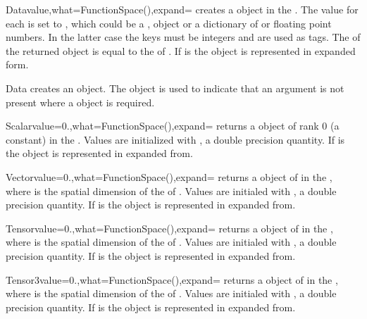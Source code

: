 \begin{classdesc}{Data}{value,what=FunctionSpace(),expand=\False}
creates a \Data object in the \FunctionSpace {}.
The value for each \DataSamplePoints is set to , which could be a \numpy, \Data object  or a dictionary of
\numpy or floating point numbers. In the latter case the keys must be integers and are used
as tags.
The \Shape of the returned object is equal to the \Shape of . If  is \True
the \Data object is represented in expanded form.
\end{classdesc}

\begin{classdesc}{Data}{}
creates an \EmptyData object. The \EmptyData object is used to indicate that an argument is not present
where a \Data object is required.
\end{classdesc}

\begin{funcdesc}{Scalar}{value=0.,what=FunctionSpace(),expand=\False}
returns a \Data object of rank 0 (a constant) in the \FunctionSpace {}.
Values are initialized with , a double precision quantity. If  is \True
the \Data object is represented in expanded from.
\end{funcdesc}

\begin{funcdesc}{Vector}{value=0.,what=FunctionSpace(),expand=\False}
returns a \Data object of \Shape {} in the \FunctionSpace {},
where  is the spatial dimension of the \Domain of .
Values are initialed with , a double precision quantity. If  is \True
the \Data object is represented in expanded from.
\end{funcdesc}

\begin{funcdesc}{Tensor}{value=0.,what=FunctionSpace(),expand=\False}
returns a \Data object of \Shape {} in the \FunctionSpace {},
where  is the spatial dimension of the \Domain of .
Values are initialed with , a double precision quantity. If  is \True
the \Data object is represented in expanded from.
\end{funcdesc}

\begin{funcdesc}{Tensor3}{value=0.,what=FunctionSpace(),expand=\False}
returns a \Data object of \Shape {} in the \FunctionSpace {},
where  is the spatial dimension of the \Domain of .
Values are initialed with , a double precision quantity. If  is \True
the \Data object is represented in expanded from.
\end{funcdesc}

